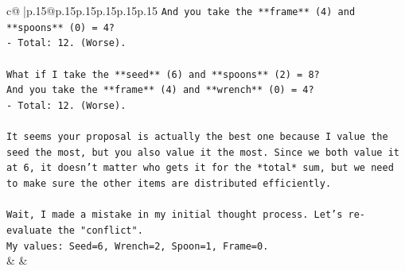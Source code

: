 \documentclass{article}
\begin{document}
{\begin{supertabular}{c@{$\;$}|p{.15\linewidth}@{}p{.15\linewidth}p{.15\linewidth}p{.15\linewidth}p{.15\linewidth}p{.15\linewidth}}
{{{\texttt{And you take the **frame** (4) and **spoons** (0) = 4?} \\
\texttt{{-} Total: 12. (Worse).} \\
\\ 
\texttt{What if I take the **seed** (6) and **spoons** (2) = 8?} \\
\texttt{And you take the **frame** (4) and **wrench** (0) = 4?} \\
\texttt{{-} Total: 12. (Worse).} \\
\\ 
\texttt{It seems your proposal is actually the best one because I value the seed the most, but you also value it the most. Since we both value it at 6, it doesn't matter who gets it for the *total* sum, but we need to make sure the other items are distributed efficiently.} \\
\\ 
\texttt{Wait, I made a mistake in my initial thought process. Let's re{-}evaluate the "conflict".} \\
\texttt{My values: Seed=6, Wrench=2, Spoon=1, Frame=0.} \\
            }
        }
    }
    & & \\ \\


\end{supertabular}}
\end{document}
